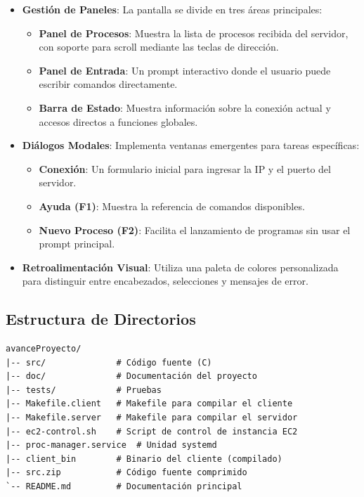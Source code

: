 \documentclass[12pt,a4paper]{report}
\begin{document}
\begin{itemize}[leftmargin=1.5em]
  \item \textbf{Gestión de Paneles}: La pantalla se divide en tres áreas principales:
    \begin{itemize}
      \item \textbf{Panel de Procesos}: Muestra la lista de procesos recibida del servidor, con soporte para scroll mediante las teclas de dirección.
      \item \textbf{Panel de Entrada}: Un prompt interactivo donde el usuario puede escribir comandos directamente.
      \item \textbf{Barra de Estado}: Muestra información sobre la conexión actual y accesos directos a funciones globales.
    \end{itemize}
  \item \textbf{Diálogos Modales}: Implementa ventanas emergentes para tareas específicas:
    \begin{itemize}
      \item \textbf{Conexión}: Un formulario inicial para ingresar la IP y el puerto del servidor.
      \item \textbf{Ayuda (F1)}: Muestra la referencia de comandos disponibles.
      \item \textbf{Nuevo Proceso (F2)}: Facilita el lanzamiento de programas sin usar el prompt principal.
    \end{itemize}
  \item \textbf{Retroalimentación Visual}: Utiliza una paleta de colores personalizada para distinguir entre encabezados, selecciones y mensajes de error.
\end{itemize}

\subsection{Estructura de Directorios}

\begin{tcolorbox}[colback=grisClaro, colframe=gray!40]
\begin{verbatim}
avanceProyecto/
|-- src/              # Código fuente (C)
|-- doc/              # Documentación del proyecto
|-- tests/            # Pruebas
|-- Makefile.client   # Makefile para compilar el cliente
|-- Makefile.server   # Makefile para compilar el servidor
|-- ec2-control.sh    # Script de control de instancia EC2
|-- proc-manager.service  # Unidad systemd
|-- client_bin        # Binario del cliente (compilado)
|-- src.zip           # Código fuente comprimido
`-- README.md         # Documentación principal
\end{verbatim}
\end{tcolorbox}
\end{document}
